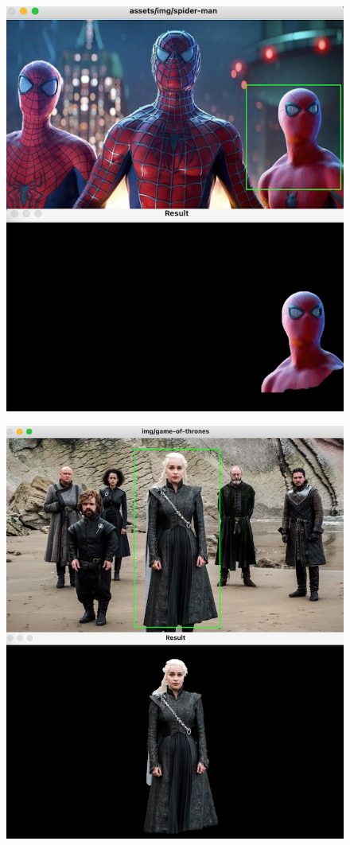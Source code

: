 \documentclass{article}
\begin{document}
\begin{figure}[H]
\centering
\begin{minipage}{.5\textwidth}
  \centering
  \includegraphics[scale=0.27]{test-spider-man}
  \label{fig:test3}
\end{minipage}%
\begin{minipage}{.5\textwidth}
  \centering
  \includegraphics[scale=0.27]{test-game-of-thrones}

\end{minipage}
\end{figure}
\end{document}

